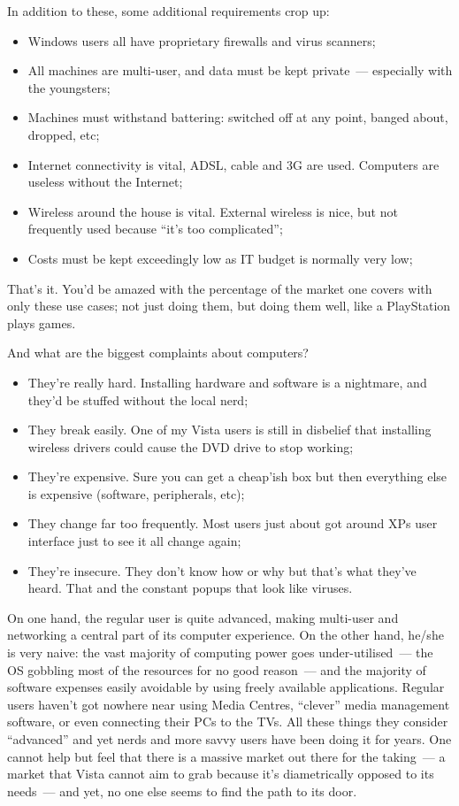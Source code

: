 \documentclass{memoir}
\begin{document}
In addition to these, some additional requirements crop up:

\begin{itemize}
\item Windows users all have proprietary firewalls and virus scanners;
\item All machines are multi-user, and data must be kept private~---
  especially with the youngsters;
\item Machines must withstand battering: switched off at any point,
  banged about, dropped, etc;
\item Internet connectivity is vital, ADSL, cable and 3G are
  used. Computers are useless without the Internet;
\item Wireless around the house is vital. External wireless is nice,
  but not frequently used because ``it's too complicated'';
\item Costs must be kept exceedingly low as IT budget is normally very
  low;
\end{itemize}

That's it. You'd be amazed with the percentage of the market one
covers with only these use cases; not just doing them, but doing them
well, like a PlayStation plays games.

And what are the biggest complaints about computers?

\begin{itemize}
\item They're really hard. Installing hardware and software is a
  nightmare, and they'd be stuffed without the local nerd;
\item They break easily. One of my Vista users is still in disbelief
  that installing wireless drivers could cause the DVD drive to stop
  working;
\item They're expensive. Sure you can get a cheap'ish box but then
  everything else is expensive (software, peripherals, etc);
\item They change far too frequently. Most users just about got around
  XPs user interface just to see it all change again;
\item They're insecure. They don't know how or why but that's what
  they've heard. That and the constant popups that look like viruses.
\end{itemize}

On one hand, the regular user is quite advanced, making multi-user and
networking a central part of its computer experience. On the other
hand, he/she is very naive: the vast majority of computing power goes
under-utilised~--- the OS gobbling most of the resources for no good
reason~--- and the majority of software expenses easily avoidable by
using freely available applications. Regular users haven't got nowhere
near using Media Centres, ``clever'' media management software, or
even connecting their PCs to the TVs. All these things they consider
``advanced'' and yet nerds and more savvy users have been doing it for
years. One cannot help but feel that there is a massive market out
there for the taking~--- a market that Vista cannot aim to grab
because it's diametrically opposed to its needs~--- and yet, no one
else seems to find the path to its door.
\end{document}
